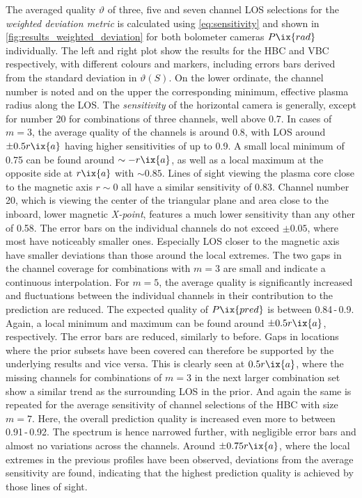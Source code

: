                 The averaged quality $\vartheta$ of three, five and seven channel LOS selections for the \textit{weighted deviation metric} is calculated using \cref{eq:sensitivity} and shown in \cref{fig:results_weighted_deviation} for both bolometer cameras $P\ix{rad}$ individually. The left and right plot show the results for the HBC and VBC respectively, with different colours and markers, including errors bars derived from the standard deviation in $\vartheta\left(S\right)$. On the lower ordinate, the channel number is noted and on the upper the corresponding minimum, effective plasma radius along the LOS. The \textit{sensitivity} of the horizontal camera is generally, except for number 20 for combinations of three channels, well above 0.7. In cases of $m=3$, the average quality of the channels is around 0.8, with LOS around $\pm0.5r\ix{a}$ having higher sensitivities of up to 0.9. A small local minimum of 0.75 can be found around $\sim -r\ix{a}$, as well as a local maximum at the opposite side at $r\ix{a}$ with $\sim 0.85$. Lines of sight viewing the plasma core close to the magnetic axis $r\sim0$ all have a similar sensitivity of 0.83. Channel number 20, which is viewing the center of the triangular plane and area close to the inboard, lower magnetic \textit{X-point}, features a much lower sensitivity than any other of 0.58. The error bars on the individual channels do not exceed $\pm0.05$, where most have noticeably smaller ones. Especially LOS closer to the magnetic axis have smaller deviations than those around the local extremes. The two gaps in the channel coverage for combinations with $m=3$ are small and indicate a continuous interpolation. For $m=5$, the average quality is significantly increased and fluctuations between the individual channels in their contribution to the prediction are reduced. The expected quality of $P\ix{pred}$ is between 0.84\,-\,0.9. Again, a local minimum and maximum can be found around $\pm0.5r\ix{a}$, respectively. The error bars are reduced, similarly to before. Gaps in locations where the prior subsets have been covered can therefore be supported by the underlying results and vice versa. This is clearly seen at $0.5r\ix{a}$, where the missing channels for combinations of $m=3$ in the next larger combination set show a similar trend as the surrounding LOS in the prior. And again the same is repeated for the average sensitivity of channel selections of the HBC with size $m=7$. Here, the overall prediction quality is increased even more to between 0.91\,-\,0.92. The spectrum is hence narrowed further, with negligible error bars and almost no variations across the channels. Around $\pm0.75r\ix{a}$, where the local extremes in the previous profiles have been observed, deviations from the average sensitivity are found, indicating that the highest prediction quality is achieved by those lines of sight.\\%
